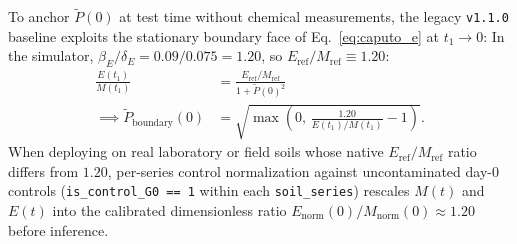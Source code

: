 \documentclass[10pt,twocolumn,a4paper]{article}
\begin{document}
\begin{table}[!htbp]
  \centering
  \caption{\textbf{Reference Soil Atlas Archetypes (\texttt{Arch\_1}--\texttt{Arch\_5}).} Normalized abiotic coordinates, carrying capacity $K_m$, memory order $\alpha$, and biokinetic simulator constants ($K_i \equiv 1.0$, $\beta_E=0.09$, $\delta_E=0.075$; $\Phi_{\text{true}}$ uses $\beta_{\text{pH}}=2.50, \text{pH}_{\text{opt}}=0.65$, exponents $0.35$ and $0.40$).}
  \label{tab:soil_atlas}
  \footnotesize
\end{table}

To anchor $\tilde{P}(0)$ at test time without chemical measurements, the legacy \texttt{v1.1.0} baseline exploits the stationary boundary face of Eq.~\eqref{eq:caputo_e} at $t_1 \to 0$: In the simulator, $\beta_E/\delta_E = 0.09/0.075 = 1.20$, so $E_{\text{ref}}/M_{\text{ref}} \equiv 1.20$:
\begin{equation}
  \begin{aligned}
    \frac{E(t_1)}{M(t_1)} &= \frac{E_{\text{ref}}/M_{\text{ref}}}{1 + \tilde{P}(0)^2} \\
    \implies \tilde{P}_{\text{boundary}}(0) &= \sqrt{\max\!\left(0,\, \frac{1.20}{E(t_1)/M(t_1)} - 1\right)}.
  \end{aligned} \label{eq:p0_boundary}
\end{equation}
When deploying on real laboratory or field soils whose native $E_{\text{ref}}/M_{\text{ref}}$ ratio differs from $1.20$, per-series control normalization against uncontaminated day-0 controls (\texttt{is\_control\_G0 == 1} within each \texttt{soil\_series}) rescales $M(t)$ and $E(t)$ into the calibrated dimensionless ratio $E_{\text{norm}}(0)/M_{\text{norm}}(0) \approx 1.20$ before inference.
\end{document}
